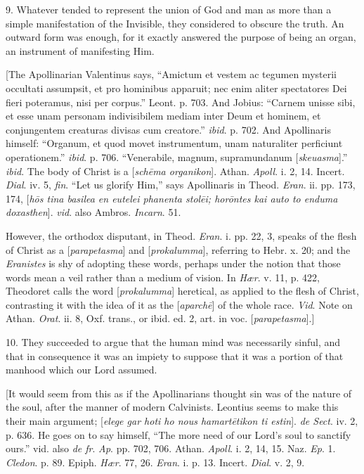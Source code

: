 9. Whatever tended to represent the union of God and man as more
than a simple manifestation of the Invisible, they considered to
obscure the truth. An outward form was enough, for it exactly answered
the purpose of being an organ, an instrument of manifesting Him.

[The Apollinarian Valentinus says, ``Amictum et
vestem ac tegumen mysterii occultati assumpsit, et pro hominibus
apparuit; nec enim aliter spectatores Dei fieri poteramus, nisi per
corpus.'' Leont. p. 703. And Jobius: ``Carnem unisse sibi, et
esse unam personam indivisibilem mediam inter Deum et hominem, et
conjungentem creaturas divisas cum creatore.'' \emph{ibid}. p.
702. And Apollinaris himself: ``Organum, et quod movet
instrumentum, unam naturaliter perficiunt operationem.'' \emph{ibid}.
p. 706. ``Venerabile, magnum, supramundanum [\emph{skeuasma}].''
\emph{ibid}. The body of Christ is a [\emph{sch\={e}ma organikon}].
Athan. \emph{Apoll}. i. 2, 14. Incert. \emph{Dial}. iv. 5, \emph{fin}.
``Let us glorify Him,'' says Apollinaris in Theod. \emph{Eran}.
ii. pp. 173, 174, [\emph{h\={o}s tina basilea en eutelei phanenta stol\={e}i;
hor\={o}ntes kai auto to enduma doxasthen}]. \emph{vid}. also
Ambros. \emph{Incarn}. 51.

However, the orthodox disputant, in Theod. \emph{Eran}.
i. pp. 22, 3, speaks of the flesh of Christ as a [\emph{parapetasma}]
and [\emph{prokalumma}], referring to Hebr. x. 20; and the \emph{Eranistes}
is shy of adopting these words, perhaps under the notion that those
words mean a veil rather than a medium of vision. In \emph{Hær}. v.
11, p. 422, Theodoret calls the word [\emph{prokalumma}] heretical, as
applied to the flesh of Christ, contrasting it with the idea of it as
the [\emph{aparch\={e}}] of the whole race. \emph{Vid}. Note on
Athan. \emph{Orat}. ii. 8, Oxf. trans., or ibid. ed. 2, art. in voc. [\emph{parapetasma}].]

10. They succeeded to argue that the human mind was necessarily
sinful, and that in consequence it was an impiety to suppose
that it was a portion of that manhood which our Lord assumed.

[It would seem from this as if the Apollinarians thought sin was of
the nature of the soul, after the manner of modern Calvinists.
Leontius seems to make this their main argument; [\emph{elege gar hoti ho
nous hamart\={e}tikon ti estin}]. \emph{de Sect}. iv. 2, p. 636.
He goes on to say himself, ``The more need of our Lord's soul to
sanctify ours.'' vid. also \emph{de fr}. \emph{Ap}. pp. 702, 706.
Athan. \emph{Apoll}. i. 2, 14, 15. Naz. \emph{Ep}. 1. \emph{Cledon}.
p. 89. Epiph. \emph{Hær}. 77, 26. \emph{Eran}. i. p. 13. Incert. \emph{Dial}.
v. 2, 9.


